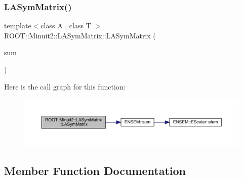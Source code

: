 \subsubsection{\texorpdfstring{LASymMatrix()}{LASymMatrix()}\hspace{0.1cm}{\footnotesize\ttfamily [20/20]}}
{\footnotesize\ttfamily template$<$class A , class T $>$ \\
R\+O\+O\+T\+::\+Minuit2\+::\+L\+A\+Sym\+Matrix\+::\+L\+A\+Sym\+Matrix (\begin{DoxyParamCaption}\item[{const \mbox{\hyperlink{classROOT_1_1Minuit2_1_1ABObj}{A\+B\+Obj}}$<$ \mbox{\hyperlink{classROOT_1_1Minuit2_1_1sym}{sym}}, \mbox{\hyperlink{classROOT_1_1Minuit2_1_1ABSum}{A\+B\+Sum}}$<$ \mbox{\hyperlink{classROOT_1_1Minuit2_1_1ABObj}{A\+B\+Obj}}$<$ \mbox{\hyperlink{classROOT_1_1Minuit2_1_1sym}{sym}}, \mbox{\hyperlink{classROOT_1_1Minuit2_1_1VectorOuterProduct}{Vector\+Outer\+Product}}$<$ \mbox{\hyperlink{classROOT_1_1Minuit2_1_1ABObj}{A\+B\+Obj}}$<$ \mbox{\hyperlink{classROOT_1_1Minuit2_1_1vec}{vec}}, \mbox{\hyperlink{classROOT_1_1Minuit2_1_1LAVector}{L\+A\+Vector}}, T $>$, T $>$, T $>$, \mbox{\hyperlink{classROOT_1_1Minuit2_1_1ABObj}{A\+B\+Obj}}$<$ \mbox{\hyperlink{classROOT_1_1Minuit2_1_1sym}{sym}}, A, T $>$ $>$, T $>$ \&}]{sum }\end{DoxyParamCaption})\hspace{0.3cm}{\ttfamily [inline]}}

Here is the call graph for this function\+:
\nopagebreak
\begin{figure}[H]
\begin{center}
\leavevmode
\includegraphics[width=350pt]{d3/d72/classROOT_1_1Minuit2_1_1LASymMatrix_aed0e1071ce94c05d4b18e7594db9a249_cgraph}
\end{center}
\end{figure}


\subsection{Member Function Documentation}
\mbox{\label{classROOT_1_1Minuit2_1_1LASymMatrix_ab1fb932a4ad517108a3b58473b6d8803}} 

